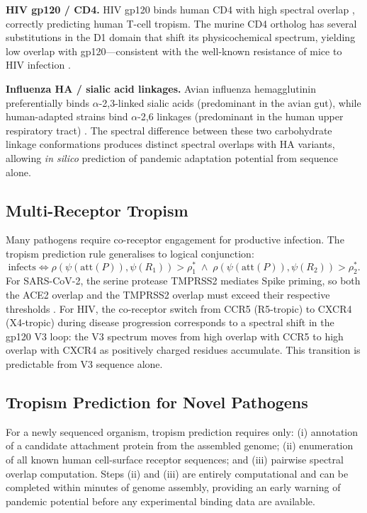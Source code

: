 \medskip\noindent\textbf{HIV gp120 / CD4.} HIV gp120 binds human CD4 with high
spectral overlap \citep{kwong1998}, correctly predicting human T-cell tropism.
The murine CD4 ortholog has several substitutions in the D1 domain that shift
its physicochemical spectrum, yielding low overlap with gp120---consistent with
the well-known resistance of mice to HIV infection \citep{berger1999}.

\medskip\noindent\textbf{Influenza HA / sialic acid linkages.} Avian influenza
hemagglutinin preferentially binds $\alpha$-2,3-linked sialic acids
(predominant in the avian gut), while human-adapted strains bind $\alpha$-2,6
linkages (predominant in the human upper respiratory tract) \citep{skehel2000}.
The spectral difference between these two carbohydrate linkage conformations
produces distinct spectral overlaps with HA variants, allowing \textit{in
silico} prediction of pandemic adaptation potential from sequence alone.

\subsection{Multi-Receptor Tropism}

Many pathogens require co-receptor engagement for productive infection. The
tropism prediction rule generalises to logical conjunction:
\begin{equation}
  \text{infects} \iff
    \rho(\psi(\text{att}(P)), \psi(R_1)) > \rho^*_1 \;\wedge\;
    \rho(\psi(\text{att}(P)), \psi(R_2)) > \rho^*_2.
  \label{ps:eq:multi_receptor}
\end{equation}
For SARS-CoV-2, the serine protease TMPRSS2 mediates Spike priming, so both the
ACE2 overlap and the TMPRSS2 overlap must exceed their respective thresholds
\citep{hoffmann2020}. For HIV, the co-receptor switch from CCR5 (R5-tropic) to
CXCR4 (X4-tropic) during disease progression \citep{berger1999} corresponds to
a spectral shift in the gp120 V3 loop: the V3 spectrum moves from high overlap
with CCR5 to high overlap with CXCR4 as positively charged residues accumulate.
This transition is predictable from V3 sequence alone.

\subsection{Tropism Prediction for Novel Pathogens}

For a newly sequenced organism, tropism prediction requires only: (i) annotation
of a candidate attachment protein from the assembled genome; (ii) enumeration
of all known human cell-surface receptor sequences; and (iii) pairwise spectral
overlap computation. Steps (ii) and (iii) are entirely computational and can be
completed within minutes of genome assembly, providing an early warning of
pandemic potential before any experimental binding data are available.



